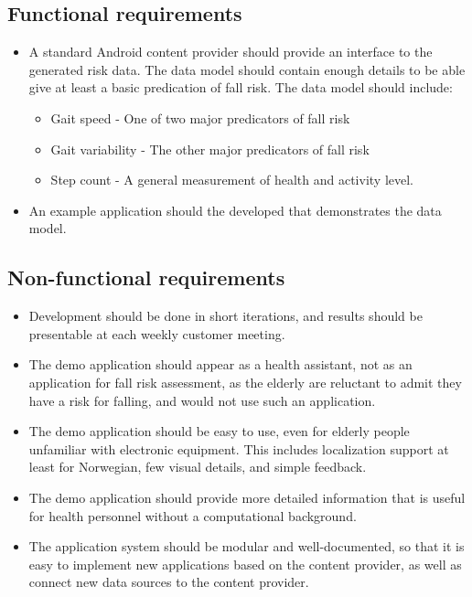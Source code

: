 \subsection{Functional requirements}
\begin{itemize}
\item A standard Android content provider should provide an interface to the generated risk data. The data model should contain enough details to be able give at least a basic predication of fall risk. The data model should include:
\begin{itemize}
\item Gait speed - One of two major predicators of fall risk
\item Gait variability - The other major predicators of fall risk
\item Step count - A general measurement of health and activity level.
\end{itemize}
\item An example application should the developed that demonstrates the data model.
\end{itemize}	

\subsection{Non-functional requirements}
\begin{itemize}
\item Development should be done in short iterations, and results should be presentable at each weekly customer meeting.
\item The demo application should appear as a health assistant, not as an application for fall risk assessment, as the elderly are reluctant to admit they have a risk for falling, and would not use such an application.
\item The demo application should be easy to use, even for elderly people unfamiliar with electronic equipment. This includes localization support at least for Norwegian, few visual details, and simple feedback.
\item The demo application should provide more detailed information that is useful for health personnel without a computational background.
\item The application system should be modular and well-documented, so that it is easy to implement new applications based on the content provider, as well as connect new data sources to the content provider.
\end{itemize}

